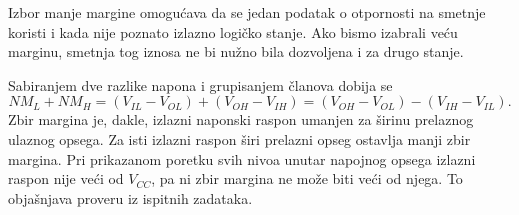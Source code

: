 Izbor manje margine omogućava da se jedan podatak o otpornosti na smetnje koristi i kada nije poznato izlazno logičko stanje. Ako bismo izabrali veću marginu, smetnja tog iznosa ne bi nužno bila dozvoljena i za drugo stanje.

Sabiranjem dve razlike napona i grupisanjem članova dobija se
\[NM_L+NM_H=(V_{IL}-V_{OL})+(V_{OH}-V_{IH})=(V_{OH}-V_{OL})-(V_{IH}-V_{IL}).\]
Zbir margina je, dakle, izlazni naponski raspon umanjen za širinu prelaznog ulaznog opsega. Za isti izlazni raspon širi prelazni opseg ostavlja manji zbir margina. Pri prikazanom poretku svih nivoa unutar napojnog opsega izlazni raspon nije veći od $V_{CC}$, pa ni zbir margina ne može biti veći od njega. To objašnjava proveru iz ispitnih zadataka.
